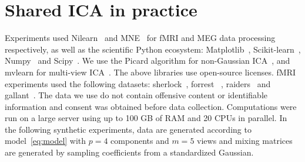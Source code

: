 \documentclass{report}
\begin{document}
{%

\chapter{Shared ICA in practice}
Experiments used Nilearn~\cite{abraham2014machine} and MNE~\cite{gramfort2013meg} for fMRI and MEG data
processing respectively, as well as the scientific Python ecosystem:
Matplotlib~\cite{hunter2007matplotlib}, Scikit-learn~\cite{pedregosa2011scikit},
Numpy~\cite{harris2020array} and Scipy~\cite{2020SciPy-NMeth}. We use the Picard algorithm for non-Gaussian ICA~\cite{ablin2018faster}, and mvlearn for multi-view ICA~\cite{perry2020mvlearn}. The above libraries use open-source licenses. fMRI experiments used the following datasets: sherlock~\cite{chen2017shared}, forrest~\cite{hanke2014high} , raiders~\cite{ibc} and gallant~\cite{ibc}. The data we use do not contain offensive content or identifiable information and consent was obtained before data collection. Computations were run on a large server using up to 100 GB of RAM and 20 CPUs in parallel.
%
In the following synthetic experiments, data are generated according to model~\eqref{eq:model} with $p=4$ components and $m=5$ views and mixing matrices are generated by sampling coefficients from a standardized Gaussian.
}
\end{document}
